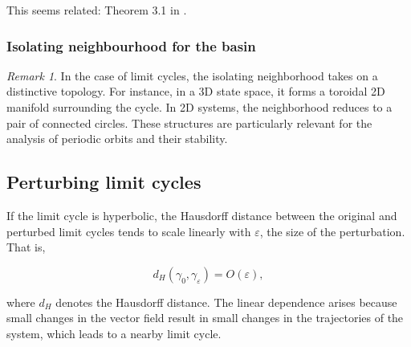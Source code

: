 \documentclass{article}
\theoremstyle{definition} \newtheorem{definition}{Definition}
\theoremstyle{remark} \newtheorem{remark}{Remark}
\newcommand{\cl}{\operatorname{cl}}
\newcommand{\boa}{\operatorname{BoA}}
\newcounter{ct}
\begin{document}
This seems related: Theorem 3.1 in \citep{butler1986persistence}.


\subsubsection{Isolating neighbourhood for the basin}\label{sec:isonbhd}
\begin{remark}%
In the case of limit cycles, the isolating neighborhood takes on a distinctive topology. For instance, in a 3D state space, it forms a toroidal 2D manifold surrounding the cycle. In 2D systems, the neighborhood reduces to a pair of connected circles. These structures are particularly relevant for the analysis of periodic orbits and their stability.
 \end{remark}


%





\subsection{Perturbing limit cycles}\label{sec:lc_pert}
If the limit cycle is hyperbolic, the Hausdorff distance between the original and perturbed limit cycles tends to scale linearly with \(\varepsilon\), the size of the perturbation. That is,

\[
d_H(\gamma_0, \gamma_\varepsilon) = O(\varepsilon),
\]

where \(d_H\) denotes the Hausdorff distance. The linear dependence arises because small changes in the vector field result in small changes in the trajectories of the system, which leads to a nearby limit cycle.
\end{document}
